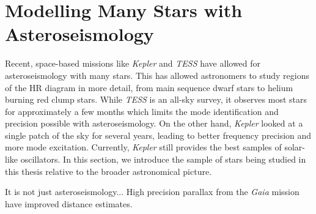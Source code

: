 


\section[Modelling Stars with Asteroseismology]{Modelling Many Stars with Asteroseismology}\label{sec:many-stars}

Recent, space-based missions like \emph{Kepler} and \emph{TESS} have allowed for asteroseismology with many stars. This has allowed astronomers to study regions of the HR diagram in more detail, from main sequence dwarf stars to helium burning red clump stars. While \emph{TESS} is an all-sky survey, it observes most stars for approximately a few months which limits the mode identification and precision possible with asteroseismology. On the other hand, \emph{Kepler} looked at a single patch of the sky for several years, leading to better frequency precision and more mode excitation. Currently, \emph{Kepler} still provides the best samples of solar-like oscillators. In this section, we introduce the sample of stars being studied in this thesis relative to the broader astronomical picture.

It is not just asteroseismology... High precision parallax from the \emph{Gaia} mission have improved distance estimates.

